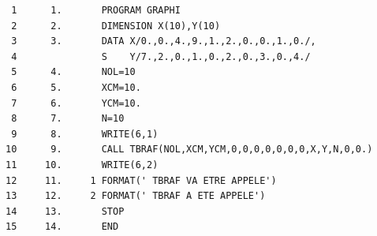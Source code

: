 {\footnotesize
\begin{verbatim}
 1      1.       PROGRAM GRAPHI
 2      2.       DIMENSION X(10),Y(10)
 3      3.       DATA X/0.,0.,4.,9.,1.,2.,0.,0.,1.,0./,
 4               S    Y/7.,2.,0.,1.,0.,2.,0.,3.,0.,4./
 5      4.       NOL=10
 6      5.       XCM=10.
 7      6.       YCM=10.
 8      7.       N=10
 9      8.       WRITE(6,1)
10      9.       CALL TBRAF(NOL,XCM,YCM,0,0,0,0,0,0,0,X,Y,N,0,0.)
11     10.       WRITE(6,2)
12     11.     1 FORMAT(' TBRAF VA ETRE APPELE')
13     12.     2 FORMAT(' TBRAF A ETE APPELE')
14     13.       STOP
15     14.       END
\end{verbatim}
}

